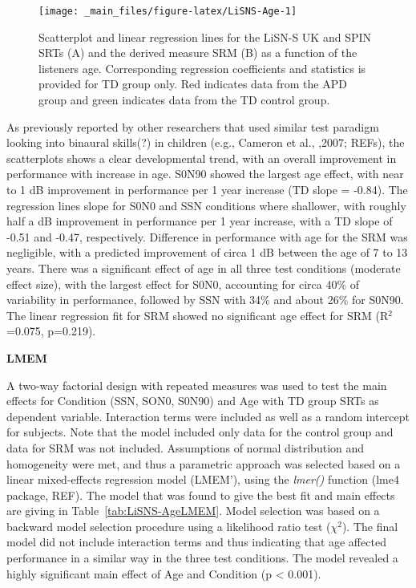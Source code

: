 \documentclass[a4paper, twoside]{templates/ociamthesis}
\begin{document}
\begin{figure}

{\centering \texttt{[image: \_main\_files/figure-latex/LiSNS-Age-1]} 

}

\caption{Scatterplot and linear regression lines for the LiSN-S UK and SPIN SRTs (A) and the derived measure SRM (B) as a function of the listeners age. Corresponding regression coefficients and statistics is provided for TD group only. Red indicates data from the APD group and green indicates data from the TD control group.}\label{fig:LiSNS-Age}
\end{figure}

As previously reported by other researchers that used similar test paradigm looking into binaural skills(?) in children (e.g., Cameron et al., ,2007; REFs), the scatterplots shows a clear developmental trend, with an overall improvement in performance with increase in age. S0N90 showed the largest age effect, with near to 1 dB improvement in performance per 1 year increase (TD slope = -0.84). The regression lines slope for S0N0 and SSN conditions where shallower, with roughly half a dB improvement in performance per 1 year increase, with a TD slope of -0.51 and -0.47, respectively. Difference in performance with age for the SRM was negligible, with a predicted improvement of circa 1 dB between the age of 7 to 13 years. There was a significant effect of age in all three test conditions (moderate effect size), with the largest effect for S0N0, accounting for circa 40\% of variability in performance, followed by SSN with 34\% and about 26\% for S0N90. The linear regression fit for SRM showed no significant age effect for SRM (R\(^{2}\)=0.075, p=0.219).

\colorbox[HTML]{CCCCFF}{\textbf{LMEM}}

A two-way factorial design with repeated measures was used to test the main effects for Condition (SSN, SON0, S0N90) and Age with TD group SRTs as dependent variable. Interaction terms were included as well as a random intercept for subjects. Note that the model included only data for the control group and data for SRM was not included. Assumptions of normal distribution and homogeneity were met, and thus a parametric approach was selected based on a linear mixed-effects regression model (LMEM'), using the \emph{lmer()} function (lme4 package, REF). The model that was found to give the best fit and main effects are giving in Table~\ref{tab:LiSNS-AgeLMEM}. Model selection was based on a backward model selection procedure using a likelihood ratio test (\(\chi^{2}\)). The final model did not include interaction terms and thus indicating that age affected performance in a similar way in the three test conditions. The model revealed a highly significant main effect of Age and Condition (p \textless{} 0.001).
\end{document}
